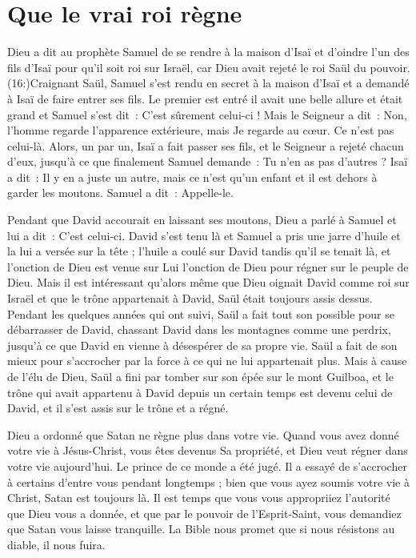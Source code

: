 \section{Que le vrai roi r\`egne}

Dieu a dit au prophète Samuel de se rendre à la maison d'Isaï et d'oindre
 l'un des fils d'Isaï pour qu'il soit roi sur Israël,
 car Dieu avait rejeté le roi Saül du pouvoir.
 (16:)Craignant Saül,
 Samuel s'est rendu en secret à la maison d'Isaï
 et a demandé à Isaï de faire entrer ses fils.
 Le premier est entré \ocadr il avait une belle allure et était grand \fcadr{}
 et Samuel s'est dit~: \og C'est sûrement celui-ci ! \fg{}
 Mais le Seigneur a dit~: \og Non, l'homme regarde l'apparence extérieure,
 mais Je regarde au cœur. Ce n'est pas celui-là. \fg{}
 Alors, un par un, Isaï a fait passer ses fils, et le Seigneur a rejeté
 chacun d'eux, jusqu'à ce que finalement Samuel demande~:
 \og Tu n'en as pas d'autres ? \fg{}
 Isaï a dit~: \og Il y en a juste un autre, mais ce n'est qu'un enfant
 et il est dehors à garder les moutons. \fg{}
 Samuel a dit~: \og Appelle-le. \fg{}

Pendant que David accourait en laissant ses moutons,
 Dieu a parlé à Samuel et lui a dit~: \og C'est celui-ci. \fg{}
 David s'est tenu là et Samuel a pris une jarre d'huile
 et la lui a versée sur la tête ; l'huile a coulé sur David
 tandis qu'il se tenait là, et l'onction de Dieu est venue sur Lui
 \ocadr l'onction de Dieu pour régner sur le peuple de Dieu.
 Mais il est intéressant qu'alors même que Dieu oignait David comme roi
 sur Israël et que le trône appartenait à David,
 Saül était toujours assis dessus. Pendant les quelques années qui ont suivi,
 Saül a fait tout son possible pour se débarrasser de David,
 chassant David dans les montagnes comme une perdrix,
 jusqu'à ce que David en vienne à désespérer de sa propre vie.
 Saül a fait de son mieux pour s'accrocher par la force à ce qui
 ne lui appartenait plus. Mais à cause de l'élu de Dieu,
 Saül a fini par tomber sur son épée sur le mont Guilboa,
 et le trône qui avait appartenu à David depuis un certain temps
 est devenu celui de David, et il s'est assis sur le trône et a régné.

Dieu a ordonné que Satan ne règne plus dans votre vie.
 Quand vous avez donné votre vie à Jésus-Christ, vous êtes devenus
 Sa propriété, et Dieu veut régner dans votre vie aujourd'hui.
 Le prince de ce monde a été jugé. Il a essayé de s'accrocher à certains
 d'entre vous pendant longtemps ; bien que vous ayez soumis votre vie
 à Christ, Satan est toujours là. Il est temps que vous vous appropriiez
 l'autorité que Dieu vous a donnée, et que par le pouvoir de l'Esprit-Saint,
 vous demandiez que Satan vous laisse tranquille.
 La Bible nous promet que si nous résistons au diable,
 il nous fuira.


